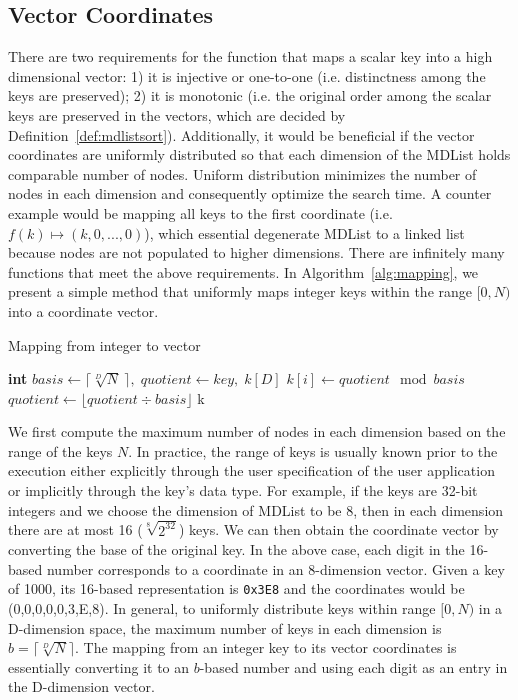 \documentclass[10pt,journal,letter,compsoc]{IEEEtran}
\begin{document}
\subsection{Vector Coordinates}
\label{sec:coord}
There are two requirements for the function that maps a scalar key into a high dimensional vector: 1) it is injective or one-to-one (i.e. distinctness among the keys are preserved); 2) it is monotonic (i.e. the original order among the scalar keys are preserved in the vectors, which are decided by Definition~\ref{def:mdlistsort}).
Additionally, it would be beneficial if the vector coordinates are uniformly distributed so that each dimension of the MDList holds comparable number of nodes. 
Uniform distribution minimizes the number of nodes in each dimension and consequently optimize the search time.
A counter example would be mapping all keys to the first coordinate (i.e. $f(k) \mapsto (k,0,...,0)$), which essential degenerate MDList to a linked list because nodes are not populated to higher dimensions.
There are infinitely many functions that meet the above requirements.
In Algorithm~\ref{alg:mapping}, we present a simple method that uniformly maps integer keys within the range $[0,N)$ into a coordinate vector.

\begin{algorithm}[th]
    \caption{Mapping from integer to vector}
    \label{alg:mapping}
    \begin{algorithmic}[1]
        \State \textbf{int} $basis \gets \lceil\sqrt[D]{N}\:\rceil,\;quotient\gets key,\;k[D]$
        \For {$i \in (D, 0]$}
        \State $k[i] \gets quotient \mod basis$
        \State $quotient \gets \lfloor quotient \div basis \rfloor$
        \EndFor
        \State \Return k
        \EndFunction
    \end{algorithmic}
\end{algorithm}

We first compute the maximum number of nodes in each dimension based on the range of the keys $N$. 
In practice, the range of keys is usually known prior to the execution either explicitly through the user specification of the user application or implicitly through the key's data type.
For example, if the keys are 32-bit integers and we choose the dimension of MDList to be 8, then in each dimension there are at most 16 ($\sqrt[8]{2^{32}}$) keys. 
We can then obtain the coordinate vector by converting the base of the original key. 
In the above case, each digit in the 16-based number corresponds to a coordinate in an 8-dimension vector.
Given a key of 1000, its 16-based representation is \texttt{0x3E8} and the coordinates would be (0,0,0,0,0,3,E,8).
In general, to uniformly distribute keys within range $[0,N)$ in a D-dimension space, the maximum number of keys in each dimension is $b=\lceil\sqrt[D]{N}\rceil$. 
The mapping from an integer key to its vector coordinates is essentially converting it to an $b$-based number and using each digit as an entry in the D-dimension vector.
\end{document}
